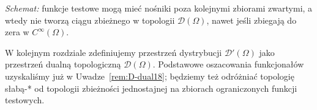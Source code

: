 \begin{center}

\small\emph{Schemat:} funkcje testowe mogą mieć nośniki poza
kolejnymi zbiorami zwartymi, a wtedy nie tworzą ciągu zbieżnego
w topologii $\mathcal D(\Omega)$, nawet jeśli zbiegają do zera
w $C^\infty(\Omega)$.
\end{center}

\begin{uwaga}
\label{rem:D-distributions-next18}
W kolejnym rozdziale zdefiniujemy przestrzeń dystrybucji
$\mathcal D'(\Omega)$ jako przestrzeń dualną topologiczną
$\mathcal D(\Omega)$. Podstawowe oszacowania funkcjonałów
uzyskaliśmy już w Uwadze~\ref{rem:D-dual18}; będziemy też
odróżniać topologię słabą-* od topologii zbieżności
jednostajnej na zbiorach ograniczonych funkcji testowych.
\end{uwaga}

